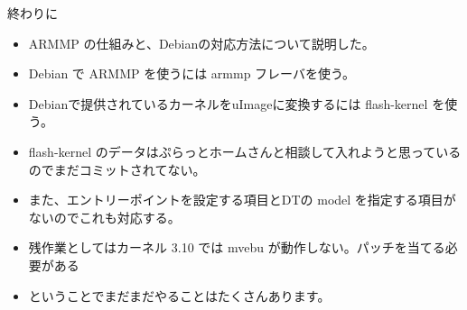 \begin{frame}{終わりに}

\begin{itemize}[<+->]
\item ARMMP の仕組みと、Debianの対応方法について説明した。
\item Debian で ARMMP を使うには armmp フレーバを使う。
\item Debianで提供されているカーネルをuImageに変換するには flash-kernel を使う。
\item flash-kernel のデータはぷらっとホームさんと相談して入れようと思っているのでまだコミットされてない。
\item また、エントリーポイントを設定する項目とDTの model を指定する項目がないのでこれも対応する。
\item 残作業としてはカーネル 3.10 では mvebu が動作しない。パッチを当てる必要がある
\item ということでまだまだやることはたくさんあります。
\end{itemize}

\end{frame}


